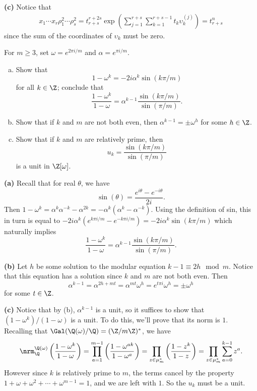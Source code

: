 \documentclass[11pt,letterpaper]{article}
\begin{document}
\begin{solution}
    \textbf{(c)} Notice that
    \[
        \begin{aligned}
            x_1\cdots x_r\rho_1^2\cdots \rho_s^2 = t_{r+s}^{r+2s}\exp\left(\sum_{j=1}^{r+s}\sum_{k=1}^{r+s-1} t_k\upsilon_k^{(j)}\right)=t^n_{r+s}
        \end{aligned}
    \]
    since the sum of the coordinates of $\upsilon_k$ must be zero.
\end{solution}

\begin{cproblem}{5.48}
    For $m\geq 3$, set $\omega=e^{2\pi i /m}$ and $\alpha=e^{\pi i /m}$. 
    \begin{enumerate}[(a)]
        \item Show that
        \[
            1-\omega^k = -2i\alpha^k\sin(k\pi /m)    
        \]
        for all $k\in \Z$; conclude that
        \[
            \frac{1-\omega^k}{1-\omega} = \alpha^{k-1}\frac{\sin(k\pi /m)}{\sin (\pi /m)}
        .\]  
        \item Show that if $k$ and $m$ are not both even, then $\alpha^{k-1}=\pm\omega^h$ for some $h\in \Z$.
        \item Show that if $k$ and $m$ are relatively prime, then 
        \[
            u_k = \frac{\sin(k\pi /m)}{\sin(\pi /m)}    
        \]  
        is a unit in $\Z[\omega]$.
    \end{enumerate}
\end{cproblem}

\begin{solution}
    \textbf{(a)} Recall that for real $\theta$, we have 
    \[
        \sin(\theta)=\frac{e^{i\theta}-e^{-i\theta}}{2i}
    .\] 
    Then $1-\omega^k=\alpha^k\alpha^{-k}-\alpha^{2k} = -\alpha^k(\alpha^k-\alpha^{-k})$. Using the definition of sin, this in turn is equal to $-2i\alpha^k(e^{k\pi i / m} - e^{-k\pi i / m}) = - 2i\alpha^k\sin(k\pi /m)$ which naturally implies 
    \[
        \frac{1-\omega^k}{1-\omega}=\alpha^{k-1}\frac{\sin(k\pi /m)}{\sin(\pi /m)}
    .\] 

    \textbf{(b)} Let $h$ be some solution to the modular equation $k-1\equiv 2h\mod m$. Notice that this equation has a solution since $k$ and $m$ are not both even. Then 
    \[
        \alpha^{k-1} = \alpha^{2h + mt} = \alpha^{mt}\omega^h = e^{t\pi i}\omega^h=\pm \omega^h 
    \] 
    for some $t\in \Z$.

    \textbf{(c)} Notice that by (b), $\alpha^{k-1}$ is a unit, so it suffices to show that $(1-\omega^k)/(1-\omega)$ is a unit. To do this, we'll prove that its norm is $1$. Recalling that $\Gal(\Q(\omega)/\Q)=(\Z/m\Z)^*$, we have
    \[
        \nrm^{\Q(\omega)}_{\Q}\left(\frac{1-\omega^k}{1-\omega}\right) = \prod^{m-1}_{a=1}\left(\frac{1-\omega^{ak}}{1-\omega^a}\right) = \prod_{z\in \mu_m^*} \left(\frac{1-z^k}{1-z}\right)=\prod_{z\in \mu_m^*}\sum^{k-1}_{a=0}z^a
    .\] 
    However since $k$ is relatively prime to $m$, the terms cancel by the property $1+\omega+\omega^2+\cdots+\omega^{m-1}=1$, and we are left with $1$. So the $u_k$ must be a unit.
\end{solution}
\end{document}
